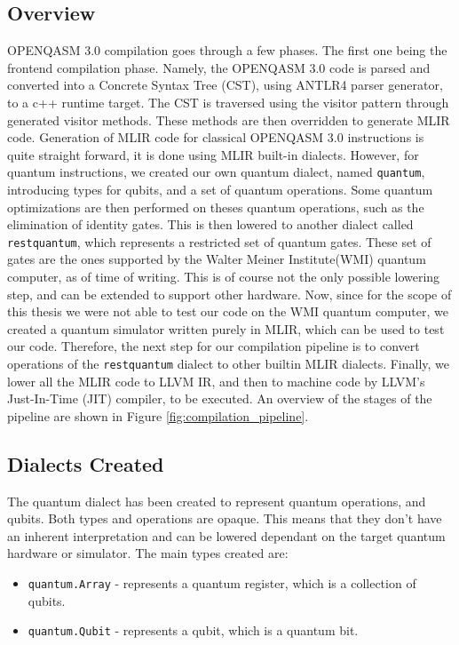 \subsection{Overview}

OPENQASM 3.0 compilation goes through a few phases. The first one being the
frontend compilation phase. Namely, the OPENQASM 3.0 code is parsed and
converted into a Concrete Syntax Tree (CST), using ANTLR4 parser generator, to a
c++ runtime target. The CST is traversed using the visitor pattern through
generated visitor methods. These methods are then overridden to generate MLIR
code. Generation of MLIR code for classical OPENQASM 3.0 instructions is quite
straight forward, it is done using MLIR built-in dialects. However, for quantum
instructions, we created our own quantum dialect, named \texttt{quantum},
introducing types for qubits, and a set of quantum operations. Some quantum
optimizations are then performed on theses quantum operations, such as the
elimination of identity gates. This is then lowered to another dialect called
\texttt{restquantum}, which represents a restricted set of quantum gates. These
set of gates are the ones supported by the Walter Meiner Institute(WMI) quantum
computer, as of time of writing. This is of course not the only possible
lowering step, and can be extended to support other hardware. Now, since for the
scope of this thesis we were not able to test our code on the WMI quantum
computer, we created a quantum simulator written purely in MLIR, which can be
used to test our code. Therefore, the next step for our compilation pipeline is
to convert operations of  
the \texttt{restquantum} dialect to other builtin MLIR dialects. Finally, we
lower all the MLIR code to LLVM IR, and then to machine code by LLVM's
Just-In-Time (JIT) compiler, to be executed.
An overview of the stages of the pipeline are shown in Figure \ref{fig:compilation_pipeline}.

\subsection{Dialects Created}
The quantum dialect has been created to represent quantum operations, and
qubits. Both types and operations are opaque. This means that they don't have an
inherent interpretation and can be lowered dependant on the target quantum
hardware or simulator. The main types created are:
\begin{itemize}
    \item \texttt{quantum.Array} - represents a quantum register, which is a
    collection of qubits.
    \item \texttt{quantum.Qubit} - represents a qubit, which is a quantum bit.
\end{itemize}
